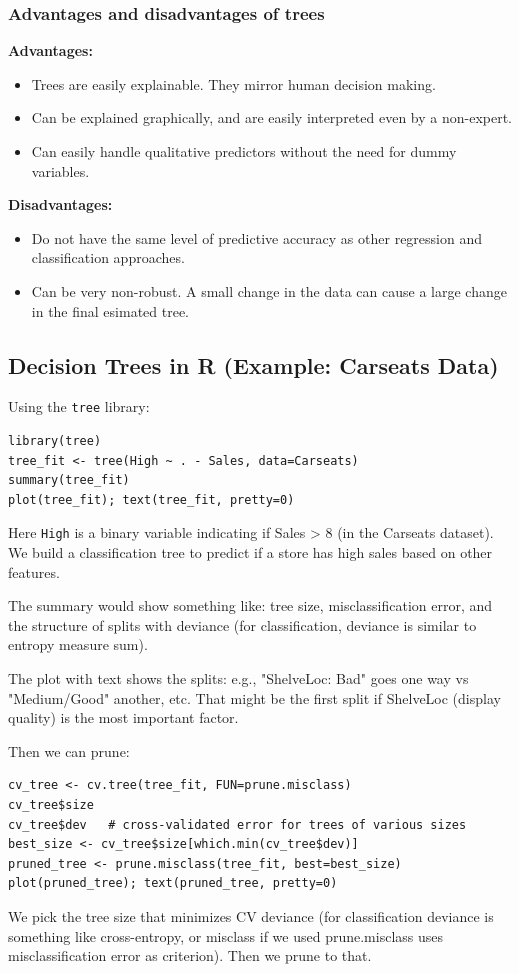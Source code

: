 \documentclass[11pt]{article}
\begin{document}
\subsubsection{Advantages and disadvantages of trees}
\noindent \textbf{Advantages:}
\begin{itemize}
    \item Trees are easily explainable. They mirror human decision making.
    \item Can be explained graphically, and are easily interpreted even by a non-expert.
    \item Can easily handle qualitative predictors without the need for dummy variables.
\end{itemize} \phantom{i}

\noindent \textbf{Disadvantages:}
\begin{itemize}
    \item Do not have the same level of predictive accuracy as other regression and classification approaches.
    \item Can be very non-robust. A small change in the data can cause a large change in the final esimated tree.
\end{itemize}

\subsection{Decision Trees in R (Example: Carseats Data)}
Using the \texttt{tree} library:
\begin{verbatim}
library(tree)
tree_fit <- tree(High ~ . - Sales, data=Carseats) 
summary(tree_fit)
plot(tree_fit); text(tree_fit, pretty=0)
\end{verbatim}
Here \texttt{High} is a binary variable indicating if Sales > 8 (in the Carseats dataset). We build a classification tree to predict if a store has high sales based on other features.

The summary would show something like: tree size, misclassification error, and the structure of splits with deviance (for classification, deviance is similar to entropy measure sum).

The plot with text shows the splits: e.g., "ShelveLoc: Bad" goes one way vs "Medium/Good" another, etc. That might be the first split if ShelveLoc (display quality) is the most important factor.

Then we can prune:
\begin{verbatim}
cv_tree <- cv.tree(tree_fit, FUN=prune.misclass)
cv_tree$size
cv_tree$dev   # cross-validated error for trees of various sizes
best_size <- cv_tree$size[which.min(cv_tree$dev)]
pruned_tree <- prune.misclass(tree_fit, best=best_size)
plot(pruned_tree); text(pruned_tree, pretty=0)
\end{verbatim}
We pick the tree size that minimizes CV deviance (for classification deviance is something like cross-entropy, or misclass if we used prune.misclass uses misclassification error as criterion). Then we prune to that.
\end{document}
